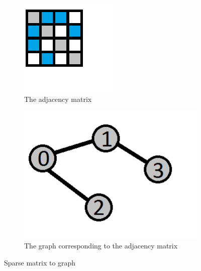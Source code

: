 \begin{figure}
	\begin{subfigure}{0.5\textwidth}
	\includegraphics[width=\textwidth]{Figures/AdjacencyM}
	\caption{The adjacency matrix}
	\label{fig:AdjacencyM}
	\end{subfigure}
	\begin{subfigure}{0.5\textwidth}
	\includegraphics[width=\textwidth]{Figures/simpleGraph}
	\caption{The graph corresponding to the adjacency matrix}
	\label{fig:matrix}
	\end{subfigure}
 	\caption{Sparse matrix to graph}
 	\label{AdjaToMatrix}
\end{figure}


